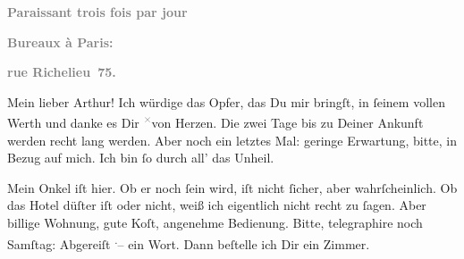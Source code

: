 \pstart
           \begin{otherlanguage}{french}\textcolor{gray}{\textbf{\textbf{Paraissant trois fois par jour}}}\end{otherlanguage}\pend
           
\pstart
           \begin{otherlanguage}{french}\textcolor{gray}{\textbf{\textbf{Bureaux à Paris:}}}\end{otherlanguage}\pend
           
\pstart
           \begin{otherlanguage}{french}\textcolor{gray}{\textbf{\textbf{rue Richelieu 75.}}}\end{otherlanguage}\pend
           
\pstart\center{}Mein lieber Arthur!\pend\vspace{0.5em}
\pstart
           Ich würdige das Opfer, das Du mir bringſt, in{ }ſeinem vollen Werth und danke es Dir \substVorne{}\textsuperscript{\textcolor{gray}{×}}\substDazwischen{}v\substHinten{}on Herzen. Die zwei Tage bis zu Deiner Ankunft werden recht lang werden. Aber
               noch ein letztes Mal: geringe Erwartung, bitte, in Bezug auf mich. Ich bin{ }ſo \label{K_L02716-1v}\label{K_L02716-1} durch all’
               das Unheil.\pend
           
\pstart
           Mein Onkel iſt hier. Ob er
               noch \label{K_L02716-2v}\label{K_L02716-2}{ }ſein wird, iſt nicht{ }ſicher,
               aber wahrſcheinlich. Ob das {\pb}Hotel düſter iſt oder nicht,
               weiß ich eigentlich nicht recht zu{ }ſagen. Aber billige Wohnung, gute Koſt, angenehme
               Bedienung. Bitte, telegraphire noch Samſtag: Abgereiſt \substVorne{}\textsuperscript{.}\substDazwischen{}–\substHinten{} ein Wort. Dann beſtelle ich Dir ein Zimmer.\pend
           
